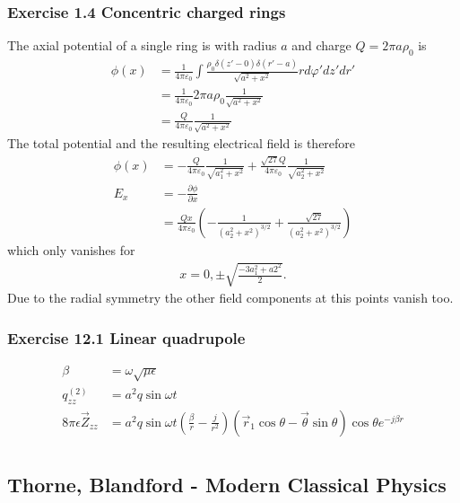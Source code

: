 \documentclass[10pt,a4paper]{book}
\theoremstyle{definition}
\begin{document}
\subsubsection{Exercise 1.4 Concentric charged rings}
The axial potential of a single ring is with radius $a$ and charge $Q=2\pi a\rho_0$ is
\begin{align}
    \phi(x)&=\frac{1}{4\pi\varepsilon_0}\int\frac{\rho_0\delta(z'-0)\delta(r'-a)}{\sqrt{a^2+x^2}}r d\varphi' dz' dr'\\
    &=\frac{1}{4\pi\varepsilon_0}2\pi a \rho_0\frac{1}{\sqrt{a^2+x^2}}\\
    &=\frac{Q}{4\pi\varepsilon_0}\frac{1}{\sqrt{a^2+x^2}}
\end{align}
The total potential and the resulting electrical field is therefore
\begin{align}
    \phi(x)&=-\frac{Q}{4\pi\varepsilon_0}\frac{1}{\sqrt{a_1^2+x^2}}+\frac{\sqrt{27}Q}{4\pi\varepsilon_0}\frac{1}{\sqrt{a_2^2+x^2}}\\
    E_x&=-\frac{\partial\phi}{\partial x}\\
    &=\frac{Qx}{4\pi\varepsilon_0}\left(-\frac{1}{(a_2^2+x^2)^{3/2}}+\frac{\sqrt{27}}{(a_2^2+x^2)^{3/2}}\right)
\end{align}
which only vanishes for
\begin{align}
    x=0,\pm\sqrt{\frac{-3a_1^2+a2^2}{2}}.
\end{align}
Due to the radial symmetry the other field components at this points vanish too.

\subsubsection{Exercise 12.1 Linear quadrupole}
\begin{align}
    \beta&=\omega\sqrt{\mu\epsilon}\\
    q_{zz}^{(2)}&=a^2q\sin\omega t\\
    8\pi\epsilon\vec{Z}_{zz}&=a^2q\sin\omega t\left(\frac{\beta}{r}-\frac{j}{r^2}\right)(\vec{r}_1\cos\theta-\vec{\theta}\sin\theta)\cos\theta e^{-j\beta r}\\
\end{align}

\subsection{{\sc Thorne, Blandford} - Modern Classical Physics}
\end{document}
